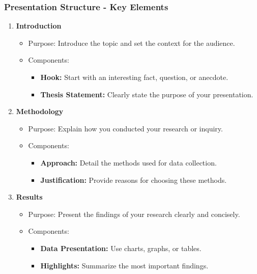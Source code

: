 \documentclass[aspectratio=169]{beamer}
\begin{document}
\begin{frame}[fragile]
    \frametitle{Presentation Structure - Key Elements}
    \begin{enumerate}
        \item \textbf{Introduction}
            \begin{itemize}
                \item Purpose: Introduce the topic and set the context for the audience.
                \item Components:
                    \begin{itemize}
                        \item \textbf{Hook:} Start with an interesting fact, question, or anecdote.
                        \item \textbf{Thesis Statement:} Clearly state the purpose of your presentation.
                    \end{itemize}
            \end{itemize}
        \item \textbf{Methodology}
            \begin{itemize}
                \item Purpose: Explain how you conducted your research or inquiry.
                \item Components:
                    \begin{itemize}
                        \item \textbf{Approach:} Detail the methods used for data collection.
                        \item \textbf{Justification:} Provide reasons for choosing these methods.
                    \end{itemize}
            \end{itemize}
        \item \textbf{Results}
            \begin{itemize}
                \item Purpose: Present the findings of your research clearly and concisely.
                \item Components:
                    \begin{itemize}
                        \item \textbf{Data Presentation:} Use charts, graphs, or tables.
                        \item \textbf{Highlights:} Summarize the most important findings.
                    \end{itemize}

\end{itemize}
\end{enumerate}
\end{frame}
\end{document}
